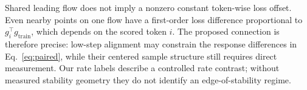 Shared leading flow does not imply a nonzero constant token-wise loss offset.  Even nearby points on one flow have a first-order loss difference proportional to \(g_i^\top g_{\mathrm{train}}\), which depends on the scored token \(i\).  The proposed connection is therefore precise: low-step alignment may constrain the response differences in Eq.~\eqref{eq:paired}, while their centered sample structure still requires direct measurement.  Our rate labels describe a controlled rate contrast; without measured stability geometry they do not identify an edge-of-stability regime.
